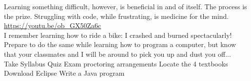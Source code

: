 \documentclass{article}
\begin{document}
Learning something difficult, however, is beneficial in and of itself. The process is the prize. Struggling with code, while frustrating, is medicine for the mind.
\\
\url{https://youtu.be/ob_GX50Za6c}
\\
I remember learning how to ride a bike:  I crashed and burned spectacularly!  Prepare to do the same while learning how to program a computer, but know that your classmates and I will be around to pick you up and dust you off...
\\
Take Syllabus Quiz
Exam proctoring arrangements
Locate the 4 textbooks
Download Eclipse
Write a Java program

\printbibliography
\end{document}
